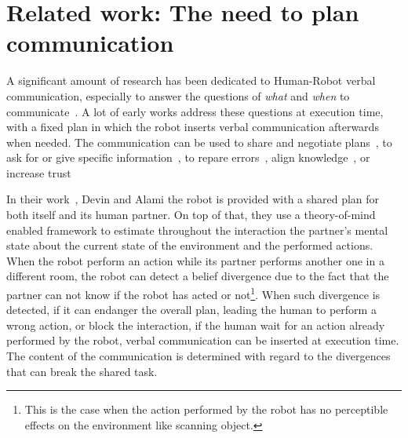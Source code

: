 \section{Related work: The need to plan communication}

A significant amount of research has been dedicated to Human-Robot verbal communication, especially to answer the questions of \textit{what} and \textit{when} to communicate~\cite{mavridis_2015_review}. A lot of early works address these questions at execution time, with a fixed plan in which the robot inserts verbal communication afterwards when needed. The communication can be used to share and negotiate plans~\cite{sebastiani_2017_dealing}, to ask for or give specific information~\cite{shah_2011_improved}, to repare errors~\cite{tellex_2014_asking}, align knowledge~\cite{devin_2016_implemented}, or increase trust~\cite{schaefer_2017_communicating}

In their work~\cite{devin_2016_implemented}, Devin and Alami the robot is provided with a shared plan for both itself and its human partner. On top of that, they use a theory-of-mind enabled framework to estimate throughout the interaction the partner's mental state about the current state of the environment and the performed actions. When the robot perform an action while its partner performs another one in a different room, the robot can detect a belief divergence due to the fact that the partner can not know if the robot has acted or not\footnote{This is the case when the action performed by the robot has no perceptible effects on the environment like scanning object.}. When such divergence is detected, if it can endanger the overall plan, leading the human to perform a wrong action, or block the interaction, if the human wait for an action already performed by the robot, verbal communication can be inserted at execution time. The content of the communication is determined with regard to the divergences that can break the shared task.

